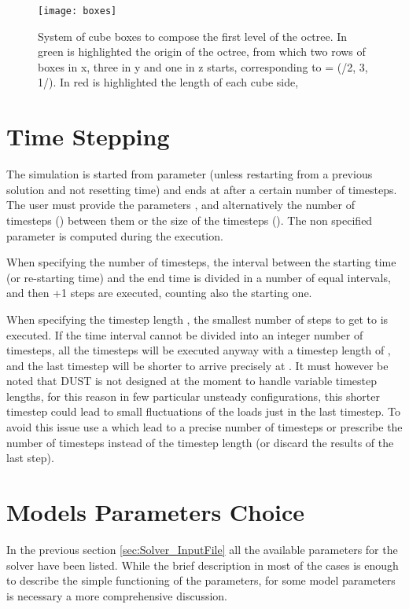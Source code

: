 \begin{figure}
\centering
\texttt{[image: boxes]}
\caption{System of cube boxes to compose the first level of the octree. 
In green is highlighted the origin of the octree, from which two rows of 
boxes in x, three in y and one in z starts, corresponding to  = (/2, 3, 1/). 
In red is highlighted the length of each cube side, }
\label{fig:boxes1}
\end{figure}




\section{Time Stepping}
\label{sec:Time_Stepping}
The simulation is started from parameter  
(unless restarting from a previous solution and not resetting time) 
and ends at  after a certain number of timesteps. 
The user must provide the parameters ,  
and alternatively the number of timesteps () between 
them or the size of the timesteps (). The non specified 
parameter is computed during the execution.

When specifying the number of timesteps, the interval between the 
starting time (or re-starting time) and the end time is divided in 
a number  of equal intervals, and then +1 
steps are executed, counting also the starting one.

When specifying the timestep length , the smallest number of 
steps to get to  is executed. If the time interval cannot be 
divided into an integer number of timesteps, all the timesteps will be 
executed anyway with a timestep length of , and the last timestep 
will be shorter to arrive precisely at . It must however be 
noted that DUST is not designed at the moment to handle variable timestep 
lengths, for this reason in few particular unsteady configurations, this 
shorter timestep could lead to small fluctuations of the loads just in the 
last timestep. To avoid this issue use a  which lead to a precise 
number of timesteps or prescribe the number of timesteps instead of the 
timestep length (or discard the results of the last step). 

\section{Models Parameters Choice}
\label{sec:Solver_ParametersChoice}
In the previous section \ref{sec:Solver_InputFile} all the available 
parameters for the \DUST{} solver have been listed. While the brief 
description in most of the cases is enough to describe the simple 
functioning of the parameters, for some model parameters is necessary 
a more comprehensive discussion. 

